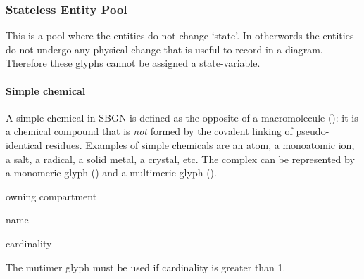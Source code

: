  
\subsubsection{Stateless Entity Pool}

This is a pool where the entities do not change `state'. In otherwords
the entities do not undergo any physical change that is useful to
record in a \PD diagram. Therefore these glyphs cannot be assigned a state-variable.

\paragraph{Simple chemical}
\label{sec:simpleChemical}

A simple chemical in SBGN is defined as the opposite of a
macromolecule (): it is a chemical compound that
is \emph{not} formed by the covalent linking of pseudo-identical
residues.  Examples of simple chemicals are an atom, a monoatomic ion,
a salt, a radical, a solid metal, a crystal, etc. The complex can be
represented by a monomeric glyph () and a multimeric
glyph ().


\begin{glyphDescription}
\begin{glyphIdentity}
  \item owning compartment
  \item name
  \item cardinality
\end{glyphIdentity}
\glyphRules The mutimer glyph
  must be used if cardinality is greater than 1.
\end{glyphDescription}


